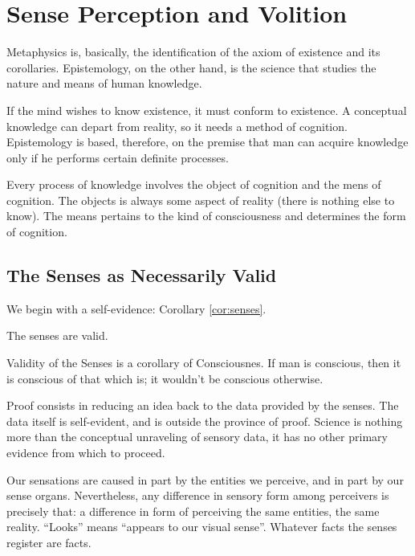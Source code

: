 \chapter{Sense Perception and Volition}
\label{cha:sense_perception}

    Metaphysics is, basically, the identification of the axiom of existence and its corollaries. Epistemology, on the other hand, is the science that studies the nature and means of human knowledge.
    
    If the mind wishes to know existence, it must conform to existence. A conceptual knowledge can depart from reality, so it needs a method of cognition. Epistemology is based, therefore, on the premise that man can acquire knowledge only if he performs certain definite processes.

    Every process of knowledge involves the object of cognition and the mens of cognition. The objects is always some aspect of reality (there is nothing else to know). The means pertains to the kind of consciousness and determines the form of cognition.
    
    \section{The Senses as Necessarily Valid}
    
        We begin with a self-evidence: Corollary \ref{cor:senses}.

            \begin{corollary}
            \label{cor:senses}
                The senses are valid.
            \end{corollary}

            \begin{remark}
                Validity of the Senses is a corollary of Consciousnes. If man is conscious, then it is conscious of that which is; it wouldn't be conscious otherwise.
            \end{remark}
        
        Proof consists in reducing an idea back to the data provided by the senses. The data itself is self-evident, and is outside the province of proof. Science is nothing more than the conceptual unraveling of sensory data, it has no other primary evidence from which to proceed.
        
        Our sensations are caused in part by the entities we perceive, and in part by our sense organs. Nevertheless, any difference in sensory form among perceivers is precisely that: a difference in form of perceiving the same entities, the same reality. ``Looks'' means ``appears to our visual sense''. Whatever facts the senses register are facts.
    
